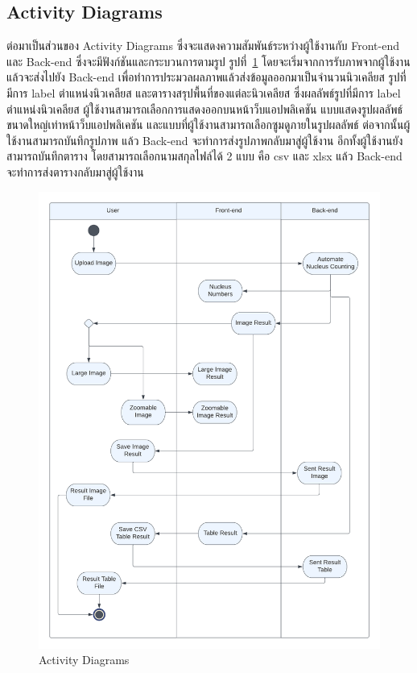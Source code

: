 \documentclass[12pt,oneside,openright,a4paper]{cpe-thai-project}
\begin{document}
\subsection{Activity Diagrams}
ต่อมาเป็นส่วนของ Activity Diagrams ซึ่งจะแสดงความสัมพันธ์ระหว่างผู้ใช้งานกับ Front-end และ Back-end ซึ่งจะมีฟังก์ชันและกระบวนการตามรูป รูปที่~\ref{fig:actty} โดยจะเริ่มจากการรับภาพจากผู้ใช้งาน แล้วจะส่งไปยัง Back-end เพื่อทำการประมวลผลภาพแล้วส่งข้อมูลออกมาเป็นจำนวนนิวเคลียส รูปที่มีการ label ตำแหน่งนิวเคลียส และตารางสรุปพื้นที่ของแต่ละนิวเคลียส ซึ่งผลลัพธ์รูปที่มีการ label ตำแหน่งนิวเคลียส ผู้ใช้งานสามารถเลือกการแสดงออกบนหน้าว็บแอปพลิเคชัน แบบแสดงรูปผลลัพธ์ขนาดใหญ่เท่าหน้าว็บแอปพลิเคชัน และแบบที่ผู้ใช้งานสามารถเลือกซูมดูภายในรูปผลลัพธ์ ต่อจากนั้นผู้ใช้งานสามารถบันทึกรูปภาพ แล้ว Back-end จะทำการส่งรูปภาพกลับมาสู่ผู้ใช้งาน อีกทั้งผู้ใช้งานยังสามารถบันทึกตาราง โดยสามารถเลือกนามสกุลไฟล์ได้ 2 แบบ คือ csv และ xlsx แล้ว Back-end จะทำการส่งตารางกลับมาสู่ผู้ใช้งาน
\begin{figure}[!h]\centering
\includegraphics[width=13cm]{images/activity.png}
\captionsetup{justification=centering}
\caption{Activity Diagrams}\label{fig:actty}
\end{figure}
\end{document}
